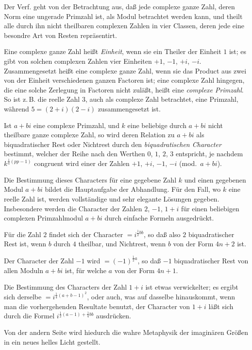 \documentclass[12pt,a4paper]{article}
\theoremstyle{plain}
\theoremstyle{definition}
\theoremstyle{remark}
\begin{document}
Der Verf. geht von der Betrachtung aus, daß jede complexe ganze Zahl, deren Norm eine ungerade Primzahl ist, als Modul betrachtet werden kann, und theilt alle durch ihn nicht theilbaren complexen Zahlen in vier Classen, deren jede eine besondre Art von Resten repräsentirt.

Eine complexe ganze Zahl heißt \textit{Einheit}, wenn sie ein Theiler der Einheit $1$ ist; es gibt von solchen complexen Zahlen vier Einheiten $+1$, $-1$, $+i$, $-i$. Zusammengesetzt heißt eine complexe ganze Zahl, wenn sie das Product aus zwei von der Einheit verschiedenen ganzen Factoren ist; eine complexe Zahl hingegen, die eine solche Zerlegung in Factoren nicht zuläßt, heißt eine \textit{complexe Primzahl}. So ist z.\,B. die reelle Zahl $3$, auch als complexe Zahl betrachtet, eine Primzahl, während $5 = (2+i)(2-i)$ zusammengesetzt ist.

Ist $a+bi$ eine complexe Primzahl, und $k$ eine beliebige durch $a+bi$ nicht theilbare ganze complexe Zahl, so wird deren Relation zu $a+bi$ als biquadratischer Rest oder Nichtrest durch den \textit{biquadratischen Character} bestimmt, welcher der Reihe nach den Werthen $0$, $1$, $2$, $3$ entspricht, je nachdem $k^{\frac{1}{4}(pp-1)}$ congruent wird einer der Zahlen $+1$, $+i$, $-1$, $-i$ (mod.~$a+bi$).

Die Bestimmung dieses Characters für eine gegebene Zahl $k$ und einen gegebenen Modul $a+bi$ bildet die Hauptaufgabe der Abhandlung. Für den Fall, wo $k$ eine reelle Zahl ist, werden vollständige und sehr elegante Lösungen gegeben. Insbesondere werden die Character der Zahlen $2$, $-1$, $1+i$ für einen beliebigen complexen Primzahlmodul $a+bi$ durch einfache Formeln ausgedrückt.

Für die Zahl $2$ findet sich der Character $= i^{\frac{1}{2}bb}$, so daß also $2$ biquadratischer Rest ist, wenn $b$ durch $4$ theilbar, und Nichtrest, wenn $b$ von der Form $4n+2$ ist.

Der Character der Zahl $-1$ wird $= (-1)^{\frac{1}{2}a}$, so daß $-1$ biquadratischer Rest von allen Moduln $a+bi$ ist, für welche $a$ von der Form $4n+1$.

Die Bestimmung des Characters der Zahl $1+i$ ist etwas verwickelter; es ergibt sich derselbe $= i^{\frac{1}{4}(a+b-1)^2}$, oder auch, was auf dasselbe hinauskommt, wenn man die vorhergehenden Resultate benutzt, der Character von $1+i$ läßt sich durch die Formel $i^{\frac{1}{2}(a-1) + \frac{1}{4}bb}$ ausdrücken.

Von der andern Seite wird hiedurch die wahre Metaphysik der imaginären Größen in ein neues helles Licht gestellt.
\end{document}
